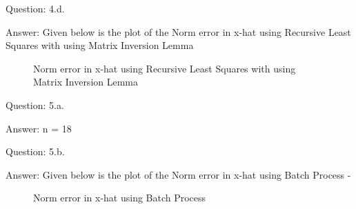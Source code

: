 \documentclass[a4paper]{article}
\begin{document}
\begin{qalist}
		\item[Question: 4.d.] \setcounter{equation}{0}
		\item[Answer:] Given below is the plot of the Norm error in x-hat using Recursive Least Squares with using Matrix Inversion Lemma
			\begin{figure}[H]			
				\vspace{0.5cm}
				\centering
				\caption{Norm error in x-hat using Recursive Least Squares with using Matrix Inversion Lemma} 
				\label{fig:q4d}
				\vspace{0.5cm}
			\end{figure}
			
		\item[Question: 5.a.] \setcounter{equation}{0}
		\item[Answer:] n = 18
		
		\item[Question: 5.b.] \setcounter{equation}{0}
		\item[Answer:] Given below is the plot of the Norm error in x-hat using Batch Process -
			\begin{figure}[H]			
				\vspace{0.5cm}
				\centering
				\caption{Norm error in x-hat using Batch Process} 
				\label{fig:q5b}
				\vspace{0.5cm}
			\end{figure}

		\newpage


\end{qalist}
\end{document}
